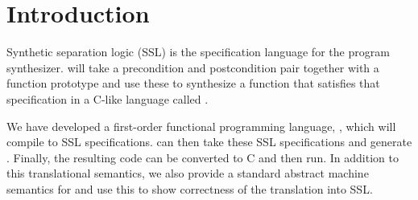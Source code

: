 \documentclass[acmsmall]{acmart}
\begin{document}



\maketitle

\section{Introduction}

Synthetic separation logic (SSL) is the specification language for the \SuSLik{} program synthesizer. \SuSLik{} will take a precondition and postcondition pair together
with a function prototype and use these to synthesize a function that satisfies that specification in a C-like language called \SuSLang.

We have developed a first-order functional programming language, \Pika, which will compile to SSL specifications. \SuSLik{} can then take these SSL specifications and generate \SuSLang. Finally, the resulting \SuSLang{} code can be converted to C and then run. In addition to this translational semantics, we also provide a standard abstract machine semantics for \Pika{} and use this to show correctness of the translation into SSL.
\end{document}
